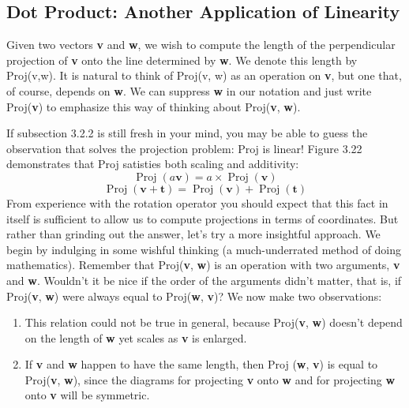 \documentclass{book}
\begin{document}
\subsection{Dot Product: Another Application of Linearity}

Given two vectors \textbf{v} and \textbf{w}, we wish to compute the length of the
perpendicular projection of \textbf{v} onto the line determined by \textbf{w}. We denote
this length by Proj(v,w). It is natural to think of Proj(v, w) as an
operation on \textbf{v}, but one that, of course, depends on \textbf{w}. We can suppress \textbf{w}
in our notation and just write Proj(\textbf{v}) to emphasize this way of thinking
about Proj(\textbf{v}, \textbf{w}).

If subsection 3.2.2 is still fresh in your mind, you may be able to guess
the observation that solves the projection problem: Proj is linear! Figure
3.22 demonstrates that Proj satisties both scaling and additivity:
$$\operatorname{Proj}(a\mathbf{v}) = a \times \operatorname{Proj}(\mathbf{v})$$
$$\operatorname{Proj}(\mathbf{v} + \mathbf{t}) = \operatorname{Proj}(\mathbf{v}) + \operatorname{Proj}(\mathbf{t})$$ 
 From experience with the rotation operator you should expect that this
fact in itself is sufficient to allow us to compute projections in terms of
coordinates. But rather than grinding out the answer, let's try a more
insightful approach. We begin by indulging in some wishful thinking
(a much-underrated method of doing mathematics). Remember that
Proj(\textbf{v}, \textbf{w}) is an operation with two arguments, \textbf{v} and \textbf{w}. Wouldn't it be
nice if the order of the arguments didn't matter, that is, if Proj(\textbf{v}, \textbf{w})
were always equal to Proj(\textbf{w}, \textbf{v})? We now make two observations:

\begin{enumerate}
\item This relation could not be true in general, because Proj(\textbf{v}, \textbf{w}) doesn't
depend on the length of \textbf{w} yet scales as \textbf{v} is enlarged.
\item If \textbf{v} and \textbf{w} happen to have the same length, then Proj (\textbf{w}, \textbf{v}) is equal to
Proj(\textbf{v}, \textbf{w}), since the diagrams for projecting \textbf{v} onto \textbf{w} and for projecting
\textbf{w} onto \textbf{v} will be symmetric.
\end{enumerate}
\end{document}
